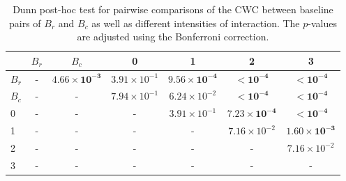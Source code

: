 \begin{table}
\centering
\caption{Dunn post-hoc test for pairwise comparisons of the CWC between baseline pairs of $B_r$ and $B_c$ as well as different intensities of interaction. The $p$-values are adjusted using the Bonferroni correction.}
\label{tab:dunn_coherence}
\begin{tabular}{lcccccc}
\toprule
 & $B_r$ & $B_c$ & 0 & 1 & 2 & 3 \\
\midrule
$B_r$ & - & $\mathbf{4.66 \times 10^{-3}}$ & $3.91 \times 10^{-1}$ & $\mathbf{9.56 \times 10^{-4}}$ & $\mathbf{< 10^{-4}}$ & $\mathbf{< 10^{-4}}$ \\
$B_c$ & - & - & $7.94 \times 10^{-1}$ & $6.24 \times 10^{-2}$ & $\mathbf{< 10^{-4}}$ & $\mathbf{< 10^{-4}}$ \\
0 & - & - & - & $3.91 \times 10^{-1}$ & $\mathbf{7.23 \times 10^{-4}}$ & $\mathbf{< 10^{-4}}$ \\
1 & - & - & - & - & $7.16 \times 10^{-2}$ & $\mathbf{1.60 \times 10^{-3}}$ \\
2 & - & - & - & - & - & $7.16 \times 10^{-2}$ \\
3 & - & - & - & - & - & - \\
\bottomrule
\end{tabular}
\end{table}
